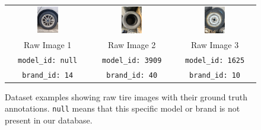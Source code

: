 \documentclass{article}
\begin{document}
\begin{figure}[H]
    \centering
    \begin{tabular}{ccc}
        \includegraphics[width=0.27\textwidth]{assets/text_dataset/raw0.jpg} &
        \includegraphics[width=0.27\textwidth]{assets/text_dataset/raw1.jpg} &
        \includegraphics[width=0.27\textwidth]{assets/text_dataset/raw2.jpg}                                                                     \\
        \small Raw Image 1                                                  & \small Raw Image 2              & \small Raw Image 3              \\
        \small \texttt{model\_id: null}                                     & \small \texttt{model\_id: 3909} & \small \texttt{model\_id: 1625} \\
        \small \texttt{brand\_id: 14}                                       & \small \texttt{brand\_id: 40}   & \small \texttt{brand\_id: 10}   \\
    \end{tabular}
    \caption{Dataset examples showing raw tire images with their ground truth annotations. \texttt{null} means that this specific model or brand is not present in our database.}
    \label{fig:dataset_examples}
\end{figure}
\end{document}
